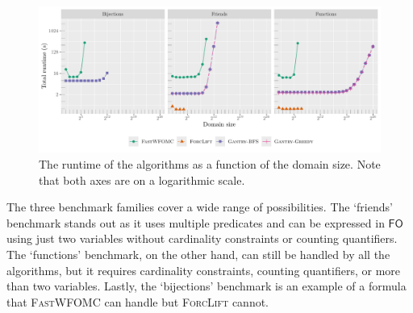 \documentclass[letterpaper]{article} %
\theoremstyle{remark}
\theoremstyle{definition}
\newcommand{\FO}{$\mathsf{FO}$}
\newcommand{\UFO}{$\mathsf{UFO}^{2} + \mathsf{CC}$}
\newcommand{\Cranetwo}{\textsc{Gantry}}
\begin{document}
\begin{figure}[t]
  \centering
  \includegraphics{plot.pdf}
  \caption{The runtime of the algorithms as a function of the domain size. Note
    that both axes are on a logarithmic scale.}\label{fig:plot}
\end{figure}


The three benchmark families cover a wide range of possibilities. The
`friends' benchmark stands out as it uses multiple predicates and can be
expressed in \FO{} using just two variables without cardinality constraints or
counting quantifiers. The `functions' benchmark, on the other hand, can still be
handled by all the algorithms, but it requires cardinality constraints, counting
quantifiers, or more than two variables. Lastly, the `bijections' benchmark is
an example of a formula that \textsc{FastWFOMC} can handle but \textsc{ForcLift}
cannot.


\end{document}
